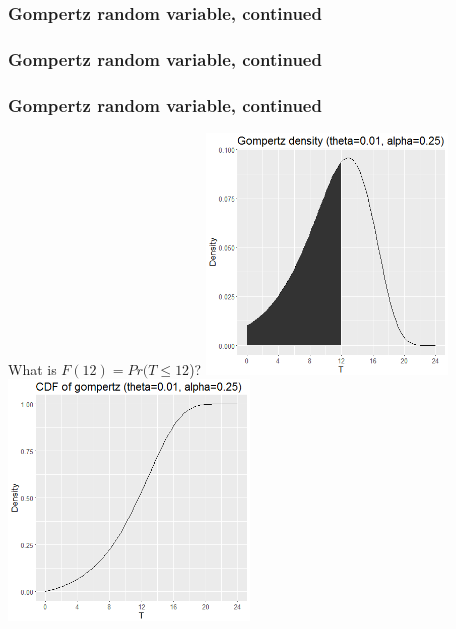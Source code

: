 \begin{frame}
\frametitle{Gompertz random variable, continued}
\end{frame}

\begin{frame}
\frametitle{Gompertz random variable, continued}
\end{frame}


\begin{frame}
\frametitle{Gompertz random variable, continued}
What is $F(12)=Pr(T\leq 12$)?
\vskip10pt
\includegraphics[width=0.48\textwidth]{Figures/shadedgompertzpdf.png}
\includegraphics[width=0.48\textwidth]{Figures/gompertzcdf.png}
\end{frame}




